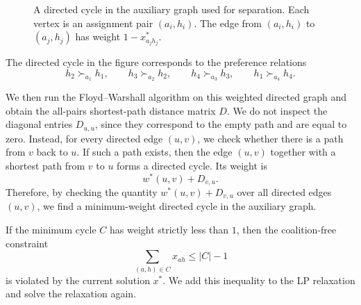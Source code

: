 \documentclass[12pt]{report}
\numberwithin{algorithm}{chapter}
\begin{document}
	\begin{figure}[H]
		\centering
		\caption{A directed cycle in the auxiliary graph used for separation. Each vertex is an assignment pair $(a_i,h_i)$. The edge from $(a_i,h_i)$ to $(a_j,h_j)$ has weight $1-x^*_{a_jh_j}$.}
		\label{fig:directed-cycle}
	\end{figure}
	
	\noindent The directed cycle in the figure corresponds to the preference relations
	\[
	h_2 \succ_{a_1} h_1,\qquad
	h_3 \succ_{a_2} h_2,\qquad
	h_4 \succ_{a_3} h_3,\qquad
	h_1 \succ_{a_4} h_4.
	\]
	
	We then run the Floyd--Warshall algorithm on this weighted directed graph and obtain the all-pairs shortest-path distance matrix $D$. We do not inspect the diagonal entries $D_{u,u}$, since they correspond to the empty path and are equal to zero. Instead, for every directed edge $(u,v)$, we check whether there is a path from $v$ back to $u$. If such a path exists, then the edge $(u,v)$ together with a shortest path from $v$ to $u$ forms a directed cycle. Its weight is
	\[
	w^{*}(u,v)+D_{v,u}.
	\]
	Therefore, by checking the quantity $w^{*}(u,v)+D_{v,u}$ over all directed edges $(u,v)$, we find a minimum-weight directed cycle in the auxiliary graph.
	
	If the minimum cycle $C$ has weight strictly less than $1$, then the coalition-free constraint
	\[
	\sum_{(a,h)\in C}x_{ah}\leq |C|-1
	\]
	is violated by the current solution $x^*$. We add this inequality to the LP relaxation and solve the relaxation again.
	
\end{document}

